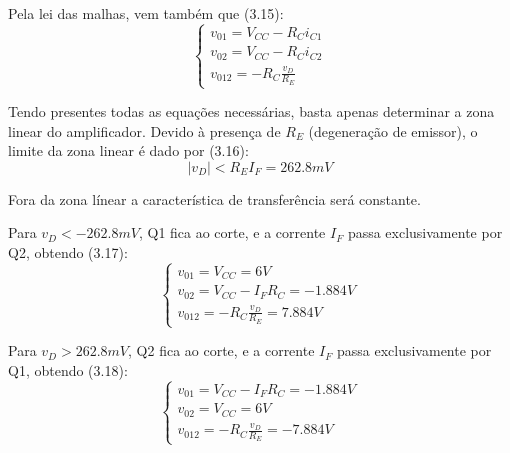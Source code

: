 \documentclass[a4paper,2pt]{report}
\begin{document}
\par Pela lei das malhas, vem também que (3.15):
\begin{equation}
    \begin{cases}
        v_{01} = V_{CC} - R_C i_{C1} \\
        v_{02} = V_{CC} - R_C i_{C2} \\
        v_{012} = - R_C \frac{v_D}{R_E}
    \end{cases}
\end{equation}

\par Tendo presentes todas as equações necessárias, basta apenas determinar a zona linear do amplificador. Devido à presença de \(R_E\) (degeneração de emissor), o limite da zona linear é dado por (3.16):
\begin{equation}
    |v_D| < R_E I_F = 262.8\textit{mV}
\end{equation}

\par Fora da zona línear a característica de transferência será constante.

\par Para \(v_D < -262.8\textit{mV}\), Q1 fica ao corte, e a corrente \(I_F\) passa exclusivamente por Q2, obtendo (3.17):
\begin{equation}
    \begin{cases}
        v_{01} = V_{CC} = 6V \\
        v_{02} = V_{CC} - I_F R_C = -1.884V \\
        v_{012} = - R_C \frac{v_D}{R_E} = 7.884V
    \end{cases}
\end{equation}

\par \par Para \(v_D > 262.8\textit{mV}\), Q2 fica ao corte, e a corrente \(I_F\) passa exclusivamente por Q1, obtendo (3.18):
\begin{equation}
    \begin{cases}
        v_{01} = V_{CC} - I_F R_C = -1.884V \\
        v_{02} = V_{CC} = 6V \\
        v_{012} = - R_C \frac{v_D}{R_E} = -7.884V
    \end{cases}
\end{equation}
\end{document}
